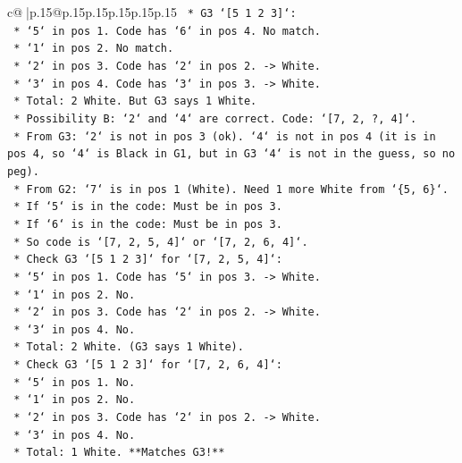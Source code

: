 \documentclass{article}
\begin{document}
{\begin{supertabular}{c@{$\;$}|p{.15\linewidth}@{}p{.15\linewidth}p{.15\linewidth}p{.15\linewidth}p{.15\linewidth}p{.15\linewidth}}
{{{\texttt{            *   G3 `{[}5 1 2 3{]}`:} \\
\texttt{                *   `5` in pos 1. Code has `6` in pos 4. No match.} \\
\texttt{                *   `1` in pos 2. No match.} \\
\texttt{                *   `2` in pos 3. Code has `2` in pos 2. {-}> White.} \\
\texttt{                *   `3` in pos 4. Code has `3` in pos 3. {-}> White.} \\
\texttt{                *   Total: 2 White. But G3 says 1 White.} \\
\texttt{    *   Possibility B: `2` and `4` are correct. Code: `{[}7, 2, ?, 4{]}`.} \\
\texttt{        *   From G3: `2` is not in pos 3 (ok). `4` is not in pos 4 (it is in pos 4, so `4` is Black in G1, but in G3 `4` is not in the guess, so no peg).} \\
\texttt{        *   From G2: `7` is in pos 1 (White). Need 1 more White from `\{5, 6\}`.} \\
\texttt{        *   If `5` is in the code: Must be in pos 3.} \\
\texttt{        *   If `6` is in the code: Must be in pos 3.} \\
\texttt{        *   So code is `{[}7, 2, 5, 4{]}` or `{[}7, 2, 6, 4{]}`.} \\
\texttt{        *   Check G3 `{[}5 1 2 3{]}` for `{[}7, 2, 5, 4{]}`:} \\
\texttt{            *   `5` in pos 1. Code has `5` in pos 3. {-}> White.} \\
\texttt{            *   `1` in pos 2. No.} \\
\texttt{            *   `2` in pos 3. Code has `2` in pos 2. {-}> White.} \\
\texttt{            *   `3` in pos 4. No.} \\
\texttt{            *   Total: 2 White. (G3 says 1 White).} \\
\texttt{        *   Check G3 `{[}5 1 2 3{]}` for `{[}7, 2, 6, 4{]}`:} \\
\texttt{            *   `5` in pos 1. No.} \\
\texttt{            *   `1` in pos 2. No.} \\
\texttt{            *   `2` in pos 3. Code has `2` in pos 2. {-}> White.} \\
\texttt{            *   `3` in pos 4. No.} \\
\texttt{            *   Total: 1 White. **Matches G3!**} \\
}}}
\end{supertabular}}
\end{document}
